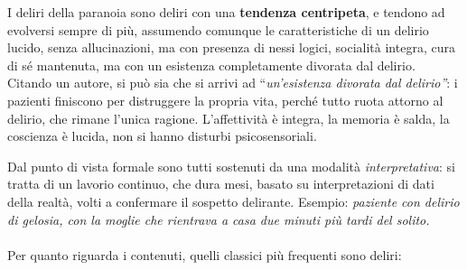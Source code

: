I deliri della paranoia sono deliri con una \textbf{tendenza
centripeta}, e tendono ad evolversi sempre di più, assumendo comunque le
caratteristiche di un delirio lucido, senza allucinazioni, ma con
presenza di nessi logici, socialità integra, cura di sé mantenuta, ma
con un esistenza completamente divorata dal delirio. Citando un autore,
si può sia che si arrivi ad ``\emph{un'esistenza divorata dal
delirio''}: i pazienti finiscono per distruggere la propria vita, perché
tutto ruota attorno al delirio, che rimane l'unica ragione.
L'affettività è integra, la memoria è salda, la coscienza è lucida, non
si hanno disturbi psicosensoriali.

Dal punto di vista formale sono tutti sostenuti da una modalità
\emph{interpretativa}: si tratta di un lavorio continuo, che dura mesi,
basato su interpretazioni di dati della realtà, volti a confermare il
sospetto delirante. Esempio: \emph{paziente con delirio di gelosia, con
la moglie che rientrava a casa due minuti più tardi del solito.}
\\\\
Per quanto riguarda i contenuti, quelli classici più frequenti sono
deliri:

